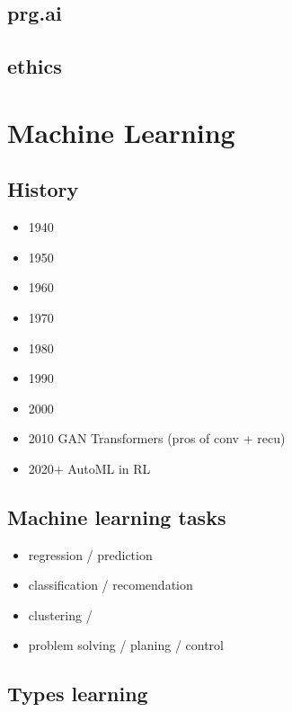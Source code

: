 \documentclass[12pt, letterpaper]{article}
\begin{document}
\subsection*{prg.ai}

\subsection*{ethics}

\section{Machine Learning}

\subsection*{}

\subsection*{History}

\begin{itemize}
    \item 1940
    \item 1950
    \item 1960
    \item 1970
    \item 1980
    \item 1990
    \item 2000
    \item 2010
    \subitem GAN
    \subitem Transformers (pros of conv + recu)
    \item 2020+
    \subitem AutoML in RL
\end{itemize}

\subsection*{Machine learning tasks}

\begin{itemize}
    \item regression / prediction
    \item classification / recomendation
    \item clustering / 
    \item problem solving / planing / control 
\end{itemize}

\subsection{Types learning}
\end{document}
